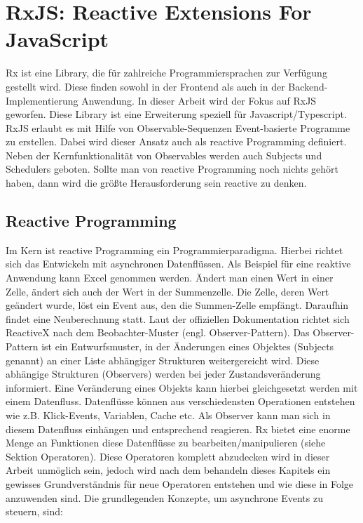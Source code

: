 \section{RxJS: Reactive Extensions For JavaScript}
Rx ist eine Library, die für zahlreiche Programmiersprachen zur Verfügung gestellt wird. Diese finden sowohl in der Frontend als auch in der Backend-Implementierung Anwendung. In dieser Arbeit wird der Fokus auf RxJS geworfen. Diese Library ist eine Erweiterung speziell für Javascript/Typescript. RxJS erlaubt es mit Hilfe von Observable-Sequenzen Event-basierte Programme zu erstellen. Dabei wird dieser Ansatz auch als reactive Programming definiert. Neben der Kernfunktionalität von Observables werden auch Subjects und Schedulers geboten. Sollte man von reactive Programming noch nichts gehört haben, dann wird die größte Herausforderung sein \glqq{}reactive\grqq{} zu denken.

\subsection{Reactive Programming}
Im Kern ist reactive Programming ein Programmierparadigma. Hierbei richtet sich das Entwickeln mit asynchronen Datenflüssen. Als Beispiel für eine reaktive Anwendung kann Excel genommen werden. Ändert man einen Wert in einer Zelle, ändert sich auch der Wert in der Summenzelle. Die Zelle, deren Wert geändert wurde, löst ein Event aus, den die Summen-Zelle empfängt. Daraufhin findet eine Neuberechnung statt.\cite{reactive-programming-beispiel} Laut der offiziellen Dokumentation richtet sich ReactiveX nach dem Beobachter-Muster (engl. Observer-Pattern). Das Observer-Pattern ist ein Entwurfsmuster, in der Änderungen eines Objektes (Subjects genannt) an einer Liste abhängiger Strukturen weitergereicht wird. Diese abhängige Strukturen (Observers) werden bei jeder Zustandsveränderung informiert. Eine Veränderung eines Objekts kann hierbei gleichgesetzt werden mit einem Datenfluss. Datenflüsse können aus verschiedensten Operationen entstehen wie z.B. Klick-Events, Variablen, Cache etc. Als Observer kann man sich in diesem Datenfluss einhängen und entsprechend reagieren.\cite{rx-intro} Rx bietet eine enorme Menge an Funktionen diese Datenflüsse zu bearbeiten/manipulieren (siehe Sektion Operatoren). Diese Operatoren komplett abzudecken wird in dieser Arbeit unmöglich sein, jedoch wird nach dem behandeln dieses Kapitels ein gewisses Grundverständnis für neue Operatoren entstehen und wie diese in Folge anzuwenden sind. Die grundlegenden Konzepte, um asynchrone Events zu steuern, sind:

